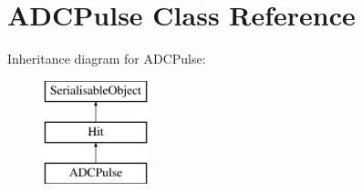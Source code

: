 \hypertarget{classADCPulse}{\section{A\-D\-C\-Pulse Class Reference}
\label{classADCPulse}
}
Inheritance diagram for A\-D\-C\-Pulse\-:\begin{figure}[H]
\begin{center}
\leavevmode
\includegraphics[height=3.000000cm]{classADCPulse}
\end{center}
\end{figure}
